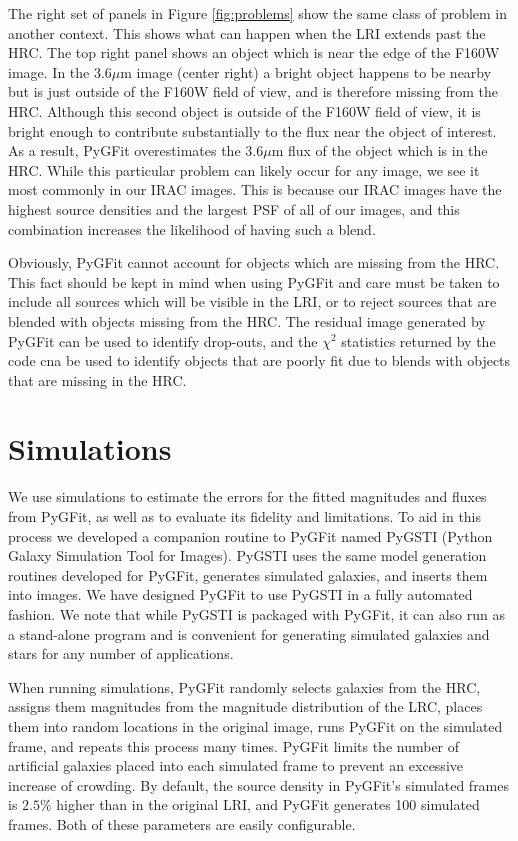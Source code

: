 \documentclass[apj]{emulateapj}
\newcommand{\pygfit}{PyGFit}
\newcommand{\pygsti}{PyGSTI}
\begin{document}
The right set of panels in Figure \ref{fig:problems} show the same class of problem in another context.  This shows what can happen when the LRI extends past the HRC.  The top right panel shows an object which is near the edge of the F160W image.  In the $3.6\mu$m image (center right) a bright object happens to be nearby but is just outside of the F160W field of view, and is therefore missing from the HRC.  Although this second object is outside of the F160W field of view, it is bright enough to contribute substantially to the flux near the object of interest.  As a result, \pygfit{} overestimates the $3.6\mu$m flux of the object which is in the HRC.  While this particular problem can likely occur for any image, we see it most commonly in our IRAC images.  This is because our IRAC images have the highest source densities and the largest PSF of all of our images, and this combination increases the likelihood of having such a blend.

Obviously, \pygfit{} cannot account for objects which are missing from the HRC.  This fact should be kept in mind when using \pygfit{} and care must be taken to include all sources which will be visible in the LRI, or to reject sources that are blended with objects missing from the HRC. The residual image generated by \pygfit{} can be used to identify drop-outs, and the $\chi^2$ statistics returned by the code cna be used to identify objects that are poorly fit due to blends with objects that are missing in the HRC.

\section{Simulations}\label{sec:sims}

We use simulations to estimate the errors for the fitted magnitudes and fluxes from \pygfit{}, as well as to evaluate its fidelity and limitations.  To aid in this process we developed a companion routine to \pygfit{} named \pygsti{} (Python Galaxy Simulation Tool for Images).  \pygsti{} uses the same model generation routines developed for \pygfit{}, generates simulated galaxies, and inserts them into images.  We have designed \pygfit{} to use \pygsti{} in a fully automated fashion.  We note that while \pygsti{} is packaged with \pygfit{}, it can also run as a stand-alone program and is convenient for generating simulated galaxies and stars for any number of applications.

When running simulations, \pygfit{} randomly selects galaxies from the HRC, assigns them magnitudes from the magnitude distribution of the LRC, places them into random locations in the original image, runs \pygfit{} on the simulated frame, and repeats this process many times.  \pygfit{} limits the number of artificial galaxies placed into each simulated frame to prevent an excessive increase of crowding.  By default, the source density in \pygfit{}'s simulated frames is $2.5\%$ higher than in the original LRI, and \pygfit{} generates 100 simulated frames.  Both of these parameters are easily configurable.
\end{document}
